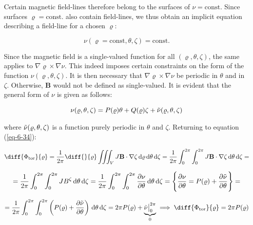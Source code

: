 Certain magnetic field-lines therefore belong to the surfaces of $\nu=\text{const}$. Since surfaces $\varrho=\text{const.}$ also contain field-lines, we thus obtain an implicit equation describing a field-line for a chosen $\varrho$:

\begin{equation}
    \nu(\varrho=\text{const},\theta,\zeta)=\text{const.}
\end{equation}

Since the magnetic field is a single-valued function for all $(\varrho, \theta, \zeta)$, the same applies to $\nabla\varrho\times\nabla\nu$. This indeed imposes certain constraints on the form of the function $\nu(\varrho, \theta, \zeta)$. It is then necessary that $\nabla\varrho\times\nabla\nu$ be periodic in $\theta$ and in $\zeta$. Otherwise, $\mathbf{B}$ would not be defined as single-valued. It is evident that the general form of $\nu$ is given as follows:

\begin{equation}
    \label{eq-6-47}
    \nu(\varrho, \theta, \zeta)=P(\varrho)\theta+Q(\varrho)\zeta+\Tilde{\nu}(\varrho, \theta, \zeta)
\end{equation}

where $\Tilde{\nu}(\varrho, \theta, \zeta)$ is a function purely periodic in $\theta$ and $\zeta$. Returning to equation (\ref{eq-6-34}):

\begin{equation*}
    \diff{\Phi_\text{tor}}{\varrho}=\frac{1}{2\pi}\diff{}{\varrho}\iiint_VJ\mathbf{B}\cdot\nabla\zeta\,\mathrm{d}\varrho\,\mathrm{d}\theta\,\mathrm{d}\zeta=\frac{1}{2\pi}\int_0^{2\pi}\int_0^{2\pi}J\mathbf{B}\cdot\nabla\zeta\,\mathrm{d}\theta\,\mathrm{d}\zeta=
\end{equation*}

\begin{equation*}
    =\frac{1}{2\pi}\int_0^{2\pi}\int_0^{2\pi}JB^\zeta\,\mathrm{d}\theta\,\mathrm{d}\zeta=\frac{1}{2\pi}\int_0^{2\pi}\int_0^{2\pi}\frac{\partial\nu}{\partial\theta}\,\mathrm{d}\theta\,\mathrm{d}\zeta=\Bigg\{\frac{\partial\nu}{\partial\theta}=P(\varrho)+\frac{\partial\Tilde{\nu}}{\partial\theta}\Bigg\}=
\end{equation*}

\begin{equation}
    =\frac{1}{2\pi}\int_0^{2\pi}\int_0^{2\pi}\left(P(\varrho)+\frac{\partial\Tilde{\nu}}{\partial\theta}\right)\,\mathrm{d}\theta\,\mathrm{d}\zeta=2\pi P(\varrho)+\underbrace{\Tilde{\nu}\bigr|_0^{2\pi}}_0\implies\diff{\Phi_\text{tor}}{\varrho}=2\pi P(\varrho)
\end{equation}

